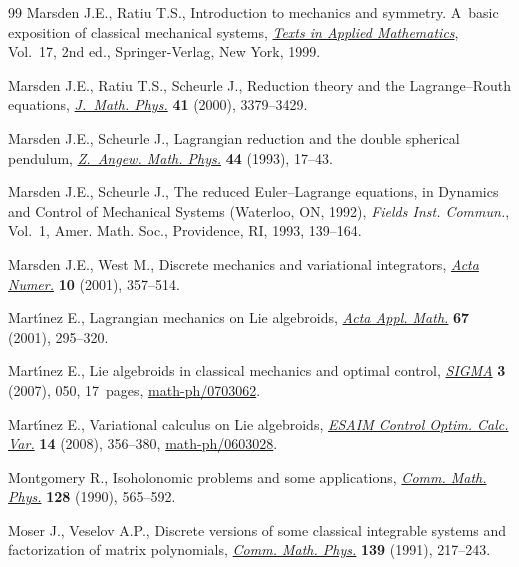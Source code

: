 \documentclass[10pt,a4paper]{amsart}
\numberwithin{equation}{section}
\begin{document}
\begin{thebibliography}{99}
Marsden J.E., Ratiu T.S., Introduction to mechanics and symmetry. A~basic
 exposition of classical mechanical systems, \href{https://doi.org/10.1007/978-0-387-21792-5}{\textit{Texts in Applied
 Mathematics}}, Vol.~17, 2nd ed., Springer-Verlag, New York, 1999.

Marsden J.E., Ratiu T.S., Scheurle J., Reduction theory and the
 {L}agrange--{R}outh equations, \href{https://doi.org/10.1063/1.533317}{\textit{J.~Math. Phys.}} \textbf{41} (2000),
 3379--3429.

Marsden J.E., Scheurle J., Lagrangian reduction and the double spherical
 pendulum, \href{https://doi.org/10.1007/BF00914351}{\textit{Z.~Angew. Math. Phys.}} \textbf{44} (1993), 17--43.

Marsden J.E., Scheurle J., The reduced {E}uler--{L}agrange equations, in
 Dynamics and Control of Mechanical Systems ({W}aterloo, {ON}, 1992),
 \textit{Fields Inst. Commun.}, Vol.~1, Amer. Math. Soc., Providence, RI,
 1993, 139--164.

Marsden J.E., West M., Discrete mechanics and variational integrators,
 \href{https://doi.org/10.1017/S096249290100006X}{\textit{Acta Numer.}} \textbf{10} (2001), 357--514.

Mart\'{\i}nez E., Lagrangian mechanics on {L}ie algebroids, \href{https://doi.org/10.1023/A:1011965919259}{\textit{Acta Appl.
 Math.}} \textbf{67} (2001), 295--320.

Mart\'{\i}nez E., Lie algebroids in classical mechanics and optimal control,
 \href{https://doi.org/10.3842/SIGMA.2007.050}{\textit{SIGMA}} \textbf{3} (2007), 050, 17~pages, \href{http://arxiv.org/abs/math-ph/0703062}{math-ph/0703062}.

Mart\'{\i}nez E., Variational calculus on {L}ie algebroids, \href{https://doi.org/10.1051/cocv:2007056}{\textit{ESAIM
 Control Optim. Calc. Var.}} \textbf{14} (2008), 356--380,
 \href{http://arxiv.org/abs/math-ph/0603028}{math-ph/0603028}.

Montgomery R., Isoholonomic problems and some applications, \href{https://doi.org/10.1007/BF02096874}{\textit{Comm. Math.
 Phys.}} \textbf{128} (1990), 565--592.

Moser J., Veselov A.P., Discrete versions of some classical integrable systems
 and factorization of matrix polynomials, \href{https://doi.org/10.1007/BF02352494}{\textit{Comm. Math. Phys.}}
 \textbf{139} (1991), 217--243.


\end{thebibliography}
\end{document}
